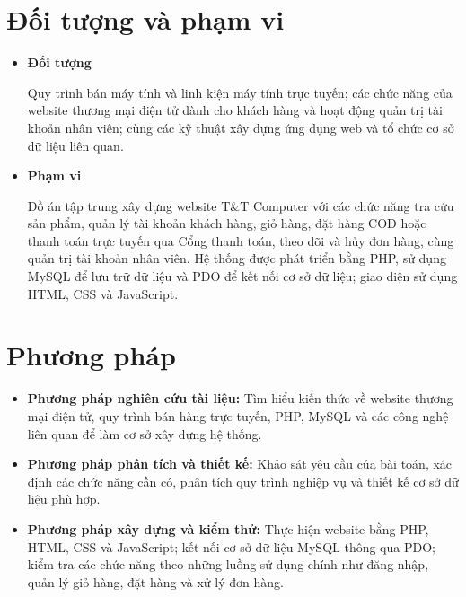 \section{Đối tượng và phạm vi}
\begin{itemize}
    \item \textbf{Đối tượng}
    
    Quy trình bán máy tính và linh kiện máy tính trực tuyến; các chức năng của website thương mại điện tử dành cho khách hàng và hoạt động quản trị tài khoản nhân viên; cùng các kỹ thuật xây dựng ứng dụng web và tổ chức cơ sở dữ liệu liên quan.
    \item \textbf{Phạm vi}
    
    Đồ án tập trung xây dựng website T\&T Computer với các chức năng tra cứu sản phẩm, quản lý tài khoản khách hàng, giỏ hàng, đặt hàng COD hoặc thanh toán trực tuyến qua Cổng thanh toán, theo dõi và hủy đơn hàng, cùng quản trị tài khoản nhân viên. Hệ thống được phát triển bằng PHP, sử dụng MySQL để lưu trữ dữ liệu và PDO để kết nối cơ sở dữ liệu; giao diện sử dụng HTML, CSS và JavaScript.
\end{itemize}


\section{Phương pháp}
\begin{itemize}
    \item \textbf{Phương pháp nghiên cứu tài liệu:} Tìm hiểu kiến thức về website thương mại điện tử, quy trình bán hàng trực tuyến, PHP, MySQL và các công nghệ liên quan để làm cơ sở xây dựng hệ thống.
    \item \textbf{Phương pháp phân tích và thiết kế:} Khảo sát yêu cầu của bài toán, xác định các chức năng cần có, phân tích quy trình nghiệp vụ và thiết kế cơ sở dữ liệu phù hợp.
    \item \textbf{Phương pháp xây dựng và kiểm thử:} Thực hiện website bằng PHP, HTML, CSS và JavaScript; kết nối cơ sở dữ liệu MySQL thông qua PDO; kiểm tra các chức năng theo những luồng sử dụng chính như đăng nhập, quản lý giỏ hàng, đặt hàng và xử lý đơn hàng.
\end{itemize}


